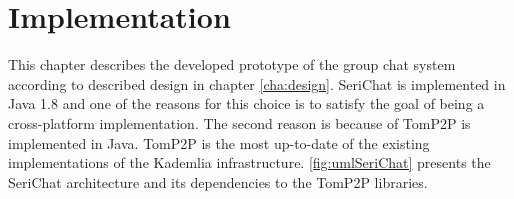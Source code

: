 \chapter{Implementation} \label{cha:implementation}
%
%
This chapter describes the developed prototype of the group chat system according to described design in chapter \ref{cha:design}.
SeriChat is implemented in Java 1.8 and one of the reasons for this choice is to satisfy the goal of being a cross-platform implementation. The second reason is because of TomP2P is implemented in Java. TomP2P is the most up-to-date of the existing implementations of the Kademlia infrastructure. \autoref{fig:umlSeriChat} presents the SeriChat architecture and its dependencies to the TomP2P libraries.

